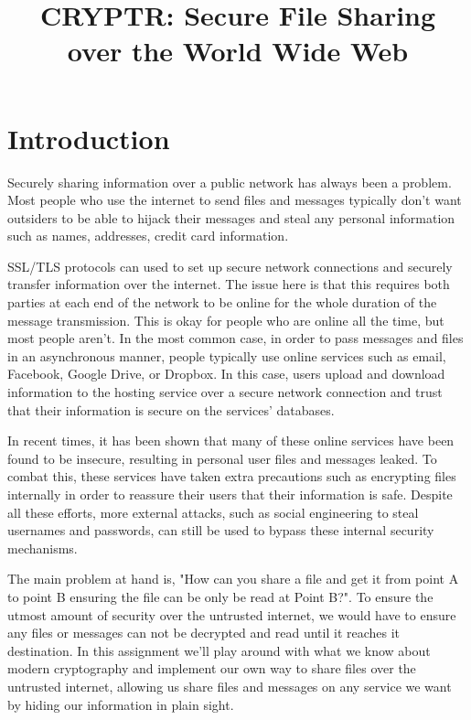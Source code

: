 \documentclass{article}
\title{ CRYPTR: Secure File Sharing \\over the World Wide Web} %
\date{} %
\begin{document}
\maketitle %


\section*{Introduction}
Securely sharing information over a public network has always been a problem. Most people who use the internet to send files and messages typically don't want outsiders to be able to hijack their messages and steal any personal information such as names, addresses, credit card information. 

SSL/TLS protocols can used to set up secure network connections and securely transfer information over the internet. The issue here is that this requires both parties at each end of the network to be online for the whole duration of the message transmission. This is okay for people who are online all the time, but most people aren't. In the most common case, in order to pass messages and files in an asynchronous manner, people typically use online services such as email, Facebook, Google Drive, or Dropbox. In this case, users upload and download information to the hosting service over a secure network connection and trust that their information is secure on the services' databases. 

 In recent times, it has been shown that many of these online services have been found to be insecure, resulting in personal user files and messages leaked. To combat this, these services have taken extra precautions such as encrypting files internally in order to reassure their users that their information is safe. Despite all these efforts, more external attacks, such as social engineering to steal usernames and passwords, can still be used to bypass these internal security mechanisms.
 
The main problem at hand is, "How can you share a file and get it from point A to point B ensuring the file can be only be read at Point B?". To ensure the utmost amount of security over the untrusted internet, we would have to ensure any files or messages can not be decrypted and read until it reaches it destination. In this assignment we'll play around with what we know about modern cryptography and implement our own way to share files over the untrusted internet, allowing us share files and messages on any service we want by hiding our information in plain sight.
\end{document}
